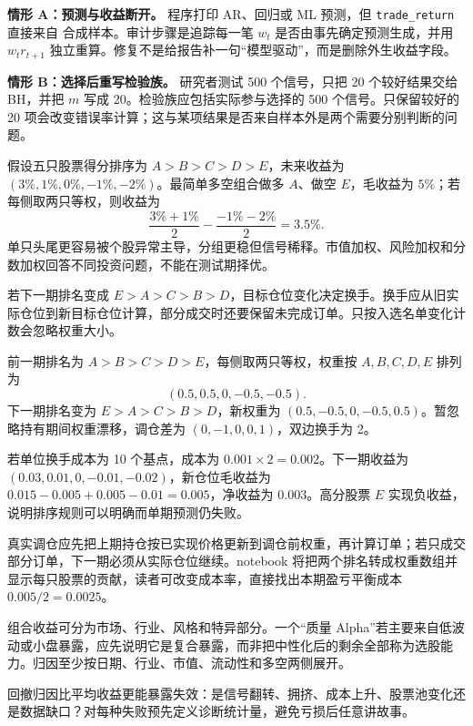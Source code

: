 
\textbf{情形 A：预测与收益断开。} 程序打印 AR、回归或 ML 预测，但 \texttt{trade\_return} 直接来自 合成样本。审计步骤是追踪每一笔 $w_t$ 是否由事先确定预测生成，并用 $w_t r_{t+1}$ 独立重算。修复不是给报告补一句“模型驱动”，而是删除外生收益字段。

\textbf{情形 B：选择后重写检验族。} 研究者测试 500 个信号，只把 20 个较好结果交给 BH，并把 $m$ 写成 20。检验族应包括实际参与选择的 500 个信号。只保留较好的 20 项会改变错误率计算；这与某项结果是否来自样本外是两个需要分别判断的问题。


假设五只股票得分排序为 $A>B>C>D>E$，未来收益为 $(3\%,1\%,0\%,-1\%,-2\%)$。最简单多空组合做多 $A$、做空 $E$，毛收益为 $5\%$；若每侧取两只等权，则收益为
\[
\frac{3\%+1\%}{2}-\frac{-1\%-2\%}{2}=3.5\%.
\]
单只头尾更容易被个股异常主导，分组更稳但信号稀释。市值加权、风险加权和分数加权回答不同投资问题，不能在测试期择优。

若下一期排名变成 $E>A>C>B>D$，目标仓位变化决定换手。换手应从旧实际仓位到新目标仓位计算，部分成交时还要保留未完成订单。只按入选名单变化计数会忽略权重大小。


前一期排名为 $A>B>C>D>E$，每侧取两只等权，权重按 $A,B,C,D,E$ 排列为
\[
 (0.5,0.5,0,-0.5,-0.5).
\]
下一期排名变为 $E>A>C>B>D$，新权重为 $(0.5,-0.5,0,-0.5,0.5)$。暂忽略持有期间权重漂移，调仓差为 $(0,-1,0,0,1)$，双边换手为 2。

若单位换手成本为 10 个基点，成本为 $0.001\times2=0.002$。下一期收益为 $(0.03,0.01,0,-0.01,-0.02)$，新仓位毛收益为 $0.015-0.005+0.005-0.01=0.005$，净收益为 $0.003$。高分股票 $E$ 实现负收益，说明排序规则可以明确而单期预测仍失败。

真实调仓应先把上期持仓按已实现价格更新到调仓前权重，再计算订单；若只成交部分订单，下一期必须从实际仓位继续。notebook 将把两个排名转成权重数组并显示每只股票的贡献，读者可改变成本率，直接找出本期盈亏平衡成本 $0.005/2=0.0025$。


组合收益可分为市场、行业、风格和特异部分。一个“质量 Alpha”若主要来自低波动或小盘暴露，应先说明它是复合暴露，而非把中性化后的剩余全部称为选股能力。归因至少按日期、行业、市值、流动性和多空两侧展开。

回撤归因比平均收益更能暴露失效：是信号翻转、拥挤、成本上升、股票池变化还是数据缺口？对每种失败预先定义诊断统计量，避免亏损后任意讲故事。

